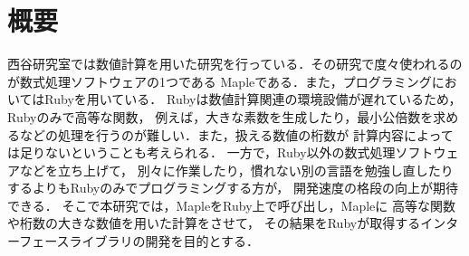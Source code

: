 \section{概要}
西谷研究室では数値計算を用いた研究を行っている．その研究で度々使われるのが数式処理ソフトウェアの1つである
Mapleである．また，プログラミングにおいてはRubyを用いている．
Rubyは数値計算関連の環境設備が遅れているため，Rubyのみで高等な関数，
例えば，大きな素数を生成したり，最小公倍数を求めるなどの処理を行うのが難しい．また，扱える数値の桁数が
計算内容によっては足りないということも考えられる．
一方で，Ruby以外の数式処理ソフトウェアなどを立ち上げて，
別々に作業したり，慣れない別の言語を勉強し直したりするよりもRubyのみでプログラミングする方が，
開発速度の格段の向上が期待できる．
そこで本研究では，MapleをRuby上で呼び出し，Mapleに
高等な関数や桁数の大きな数値を用いた計算をさせて，
その結果をRubyが取得するインターフェースライブラリの開発を目的とする．

